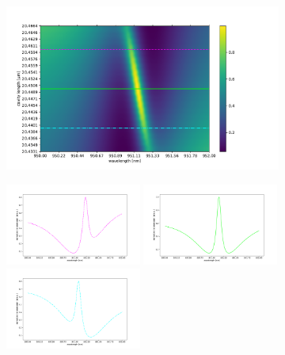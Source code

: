 \begin{figure}[h!]
    \centering
    \begin{subfigure}[c]{0.49\textwidth}
        \centering
        \includegraphics[width=\textwidth]{figures/cmap_with_slice_indicators1.pdf}
        \caption{}
        \label{fig:cmap_single}
    \end{subfigure}
    \begin{subfigure}[c]{0.49\textwidth}
        \centering
        \includegraphics[width=0.49\textwidth]{figures/cmap_slice2.pdf}
        \newline
        \includegraphics[width=0.49\textwidth]{figures/cmap_slice1.pdf}
        \includegraphics[width=0.49\textwidth]{figures/cmap_slice3.pdf}

\end{subfigure}
\end{figure}
